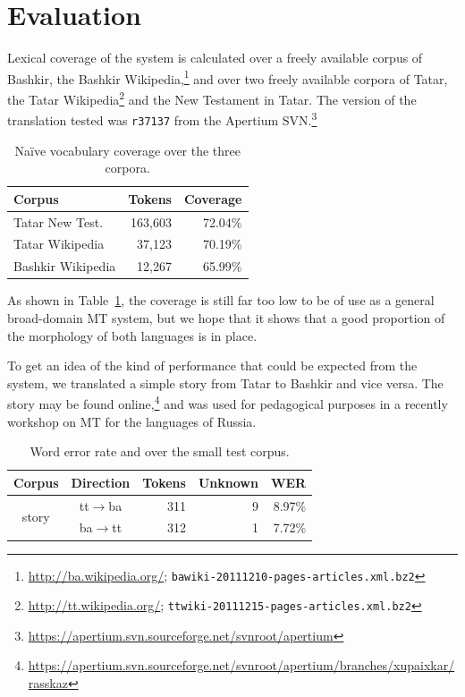 \documentclass[11pt]{article}
\begin{document}
\section{Evaluation}
\label{sec:eval}

Lexical coverage of the system is calculated over a freely available corpus of Bashkir, the Bashkir
Wikipedia,\footnote{\url{http://ba.wikipedia.org/}; {\tt bawiki-20111210-pages-articles.xml.bz2}} and over two freely available corpora of 
Tatar, the Tatar Wikipedia\footnote{\url{http://tt.wikipedia.org/}; {\tt ttwiki-20111215-pages-articles.xml.bz2}} and the New Testament in Tatar. The version of the translation tested was {\tt {\small r37137}} from the Apertium SVN.\footnote{\url{https://apertium.svn.sourceforge.net/svnroot/apertium}}

\begin{table}[htbp]
  \begin{center}
  \begin{tabular}{lrr}
  \toprule
   Corpus                  & Tokens    & Coverage\\
	\midrule
   Tatar New Test.         & 163,603   & 72.04\% \\
   Tatar Wikipedia         & 37,123    & 70.19\% \\
   \midrule
   Bashkir Wikipedia       & 12,267    & 65.99\% \\
   \bottomrule
  \end{tabular}
    \caption{Na\"ive vocabulary coverage over the three corpora.}
    \label{table:coverage}
  \end{center}
\end{table}

As shown in Table~\ref{table:coverage}, the coverage is still far too low to be of use as a 
general broad-domain MT system, but we hope that it shows that a good proportion of 
the morphology of both languages is in place.

To get an idea of the kind of performance that could be expected from the system, we 
translated a simple story from Tatar to Bashkir and vice versa. The story may be found 
online,\footnote{\url{https://apertium.svn.sourceforge.net/svnroot/apertium/branches/xupaixkar/rasskaz}}
and was used for pedagogical purposes in a recently workshop on MT
for the languages of Russia.

\begin{table}[htbp]
  \begin{center}
  \begin{tabular}{ccrrr}
  \toprule
   Corpus                 & Direction         & Tokens  & Unknown & WER  \\
  \midrule
   \multirow{2}{*}{story} & tt$\rightarrow$ba & 311     & 9  & 8.97\% \\
                          & ba$\rightarrow$tt & 312     & 1  & 7.72\%  \\
  \bottomrule
  \end{tabular}
    \caption{Word error rate and over the small test corpus.}
    \label{table:wer}
  \end{center}
\end{table}
\end{document}

